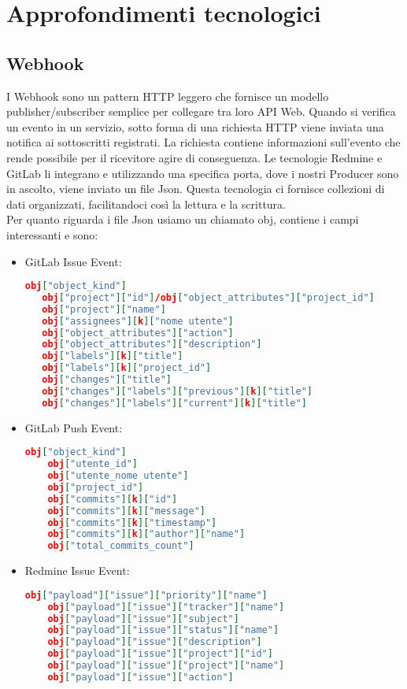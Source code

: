 \newpage
\section{Approfondimenti tecnologici}\label{ApprofondimentiTecnologici}
	
	\subsection{Webhook}
		I Webhook sono un pattern HTTP leggero che fornisce un modello publisher/subscriber semplice
		per collegare tra loro API Web.	
		Quando si verifica un evento in un servizio, sotto forma di una richiesta HTTP viene inviata una
		notifica ai sottoscritti registrati. La richiesta contiene informazioni sull'evento che rende
		possibile per il ricevitore agire di conseguenza.
		Le tecnologie Redmine e GitLab li integrano e utilizzando una specifica porta, dove i nostri
		Producer sono in ascolto, viene inviato un file Json. Questa tecnologia ci fornisce
		collezioni di dati organizzati, facilitandoci così la lettura e la scrittura.\\
        Per quanto riguarda i file Json usiamo un  chiamato obj, contiene i campi interessanti e sono:
            \begin{itemize}
                \item GitLab Issue Event:
\begin{lstlisting}[language = json]
   obj["object_kind"]
   obj["project"]["id"]/obj["object_attributes"]["project_id"]
   obj["project"]["name"]
   obj["assignees"][k]["nome utente"]
   obj["object_attributes"]["action"]
   obj["object_attributes"]["description"]
   obj["labels"][k]["title"]
   obj["labels"][k]["project_id"]
   obj["changes"]["title"]
   obj["changes"]["labels"]["previous"][k]["title"]
   obj["changes"]["labels"]["current"][k]["title"]
\end{lstlisting}
                \item GitLab Push Event:
\begin{lstlisting}[language = json]
    obj["object_kind"]
    obj["utente_id"]
    obj["utente_nome utente"]
    obj["project_id"]
    obj["commits"][k]["id"]
    obj["commits"][k]["message"]
    obj["commits"][k]["timestamp"]
    obj["commits"][k]["author"]["name"]
    obj["total_commits_count"]
\end{lstlisting}
                \item Redmine Issue Event:
\begin{lstlisting}[language = json]
    obj["payload"]["issue"]["priority"]["name"]
    obj["payload"]["issue"]["tracker"]["name"]
    obj["payload"]["issue"]["subject"]
    obj["payload"]["issue"]["status"]["name"]
    obj["payload"]["issue"]["description"]
    obj["payload"]["issue"]["project"]["id"]
    obj["payload"]["issue"]["project"]["name"]
    obj["payload"]["issue"]["action"]
\end{lstlisting}
            \end{itemize}
	
